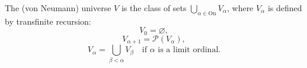 The (von Neumann) universe $V$ is the class of sets $\bigcup_{\alpha \in \mathrm{On}} V_{\alpha}$, where $V_\alpha$ is defined by transfinite recursion:
$$V_0 = \varnothing,$$
$$V_{\alpha+1} = \mathcal{P}(V_{\alpha}),$$
$$V_{\alpha} = \bigcup_{\beta < \alpha} V_{\beta} \quad \text{if } \alpha \text{ is a limit ordinal}.$$
